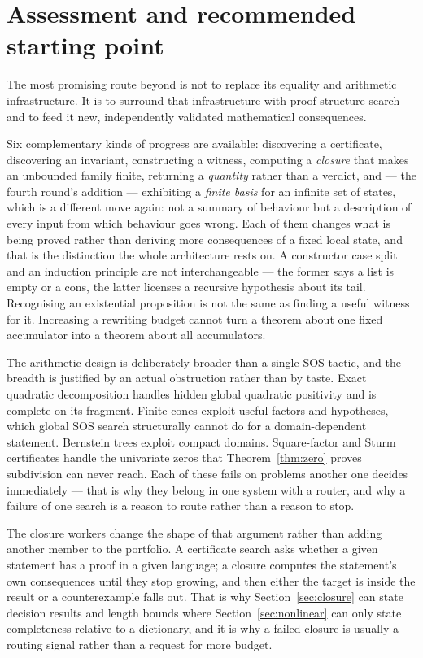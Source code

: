 \section{Assessment and recommended starting point}

The most promising route beyond \grind{} is not to replace its equality and
arithmetic infrastructure. It is to surround that infrastructure with
proof-structure search and to feed it new, independently validated mathematical
consequences.

Six complementary kinds of progress are available: discovering a certificate,
discovering an invariant, constructing a witness, computing a \emph{closure}
that makes an unbounded family finite, returning a \emph{quantity} rather than
a verdict, and --- the fourth round's addition --- exhibiting a \emph{finite
basis} for an infinite set of states, which is a different move again: not a
summary of behaviour but a description of every input from which behaviour goes
wrong. Each of them changes what
is being proved rather than deriving more consequences of a fixed local state,
and that is the distinction the whole architecture rests on. A constructor case
split and an induction principle are not interchangeable --- the former says a
list is empty or a cons, the latter licenses a recursive hypothesis about its
tail. Recognising an existential proposition is not the same as finding a useful
witness for it. Increasing a rewriting budget cannot turn a theorem about one
fixed accumulator into a theorem about all accumulators.

The arithmetic design is deliberately broader than a single SOS tactic, and the
breadth is justified by an actual obstruction rather than by taste. Exact
quadratic decomposition handles hidden global quadratic positivity and is
complete on its fragment. Finite cones exploit useful factors and hypotheses,
which global SOS search structurally cannot do for a domain-dependent statement.
Bernstein trees exploit compact domains. Square-factor and Sturm certificates
handle the univariate zeros that Theorem~\ref{thm:zero} proves subdivision can
never reach. Each of these fails on problems another one decides immediately ---
that is why they belong in one system with a router, and why a failure of one
search is a reason to route rather than a reason to stop.

The closure workers change the shape of that argument rather than adding another
member to the portfolio. A certificate search asks whether a given statement has
a proof in a given language; a closure computes the statement's own consequences
until they stop growing, and then either the target is inside the result or a
counterexample falls out. That is why Section~\ref{sec:closure} can state
decision results and length bounds where Section~\ref{sec:nonlinear} can only
state completeness relative to a dictionary, and it is why a failed closure is
usually a routing signal rather than a request for more budget.

